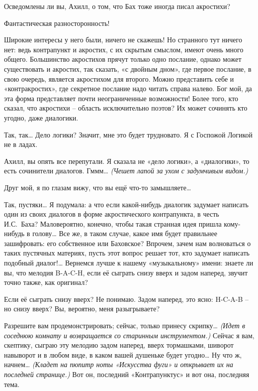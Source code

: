 \documentclass[../main.tex]{subfiles}
\begin{document}
\begin{dialogue}
 Осведомлены ли вы, Ахилл, о том, что Бах тоже иногда писал акростихи?

 Фантастическая разносторонность!

 Широкие интересы у него были, ничего не скажешь! Но странного тут ничего нет: ведь контрапункт и акростих, с их скрытым смыслом, имеют очень много общего. Большинство акростихов прячут только одно послание, однако может существовать и акростих, так сказать, «с двойным дном», где первое послание, в свою очередь, является акростихом для второго. Можно представить себе и «контракростих», где секретное послание надо читать справа налево. Бог мой, да эта форма представляет почти неограниченные возможности! Более того, кто сказал, что акростихи \--- область исключительно поэтов? Их может сочинять кто угодно, даже диалогики.

 Так, так\ldots{} Дело логики? Значит, мне это будет трудновато. Я с Госпожой Логикой не в ладах.

 Ахилл, вы опять все перепутали. Я сказала не «дело логики», а «диалогики», то есть сочинители диалогов. Гммм\ldots{} \emph{(Чешет лапой за ухом с задумчивым видом.)}

 Друг мой, я по глазам вижу, что вы ещё что-то замышляете\ldots{}

 Так, пустяки\ldots{} Я подумала: а что если какой-нибудь диалогик задумает написать один из своих диалогов в форме акростического контрапункта, в честь И.С.~Баха? Маловероятно, конечно, чтобы такая странная идея пришла кому-нибудь в голову\ldots{} Все же, в таком случае, какое имя будет правильнее зашифровать: его собственное или Баховское? Впрочем, зачем нам волноваться о таких пустячных материях, пусть этот вопрос решает тот, кто задумает написать подобный диалог!\ldots{} Вернемся лучше к нашему «музыкальному» имени: знаете ли вы, что мелодия \mbox{B-A-C-H}, если её сыграть снизу вверх и задом наперед, звучит точно также, как оригинал?

 Если её сыграть снизу вверх? Не понимаю. Задом наперед, это ясно: \mbox{H-C-A-B} \--- но снизу вверх? Вы, вероятно, меня разыгрываете?

 Разрешите вам продемонстрировать; сейчас, только принесу скрипку\ldots{} \emph{(Идет в соседнюю комнату и возвращается со старинным инструментом.)} Сейчас я вам, скептику, сыграю эту мелодию задом наперед, вверх тормашками, шиворот навыворот и в любом виде, в каком вашей душеньке будет угодно\ldots{} Ну что ж, начнем\ldots{} \emph{(Кладет на пюпитр ноты «Искусства фуги» и открывает их на последней странице.)} Вот он, последний «Контрапунктус» и вот она, последняя тема.


\end{dialogue}
\end{document}
